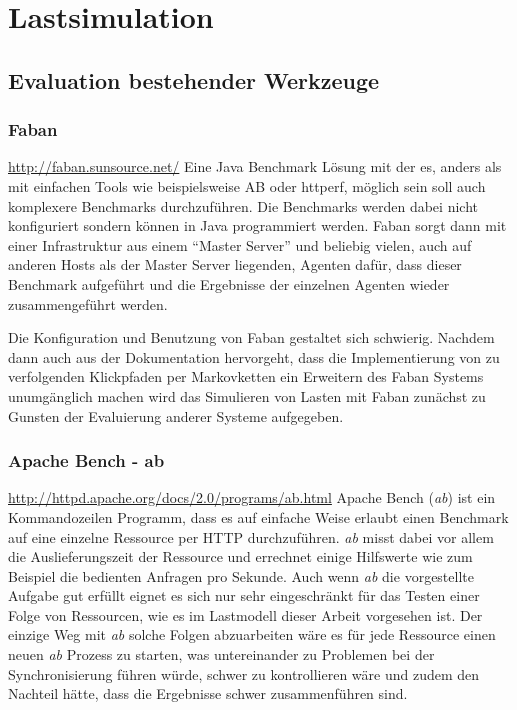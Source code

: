 \documentclass[1p]{scrartcl}
\begin{document}
  \section{Lastsimulation}
  \subsection{Evaluation bestehender Werkzeuge}
  \subsubsection{Faban}
  \url{http://faban.sunsource.net/}
  Eine Java Benchmark Lösung mit der es, anders als mit einfachen Tools wie
  beispielsweise AB oder httperf, möglich sein soll auch komplexere Benchmarks
  durchzuführen. Die Benchmarks werden dabei nicht konfiguriert sondern können
  in Java programmiert werden. Faban sorgt dann mit einer Infrastruktur aus 
  einem ``Master Server'' und beliebig vielen, auch auf anderen Hosts als der
  Master Server liegenden, Agenten dafür, dass dieser Benchmark aufgeführt und
  die Ergebnisse der einzelnen Agenten wieder zusammengeführt werden.
  
  Die Konfiguration und Benutzung von Faban gestaltet sich schwierig. Nachdem 
  dann auch aus der Dokumentation hervorgeht, dass die Implementierung von
  zu verfolgenden Klickpfaden per Markovketten ein Erweitern des Faban Systems
  unumgänglich machen wird das Simulieren von Lasten mit Faban zunächst zu 
  Gunsten der Evaluierung anderer Systeme aufgegeben.
  
  \subsubsection{Apache Bench - ab}
  \url{http://httpd.apache.org/docs/2.0/programs/ab.html}
  Apache Bench (\textit{ab}) ist ein Kommandozeilen Programm, dass es auf einfache Weise
  erlaubt einen Benchmark auf eine einzelne Ressource per HTTP durchzuführen.
  \textit{ab} misst dabei vor allem die Auslieferungszeit der Ressource und errechnet
  einige Hilfswerte wie zum Beispiel die bedienten Anfragen pro Sekunde.
  Auch wenn \textit{ab} die vorgestellte Aufgabe gut erfüllt eignet es sich nur sehr
  eingeschränkt für das Testen einer Folge von Ressourcen, wie es im Lastmodell
  dieser Arbeit vorgesehen ist. Der einzige Weg mit \textit{ab} solche Folgen 
  abzuarbeiten wäre es für jede Ressource einen neuen \textit{ab} Prozess zu starten, was
  untereinander zu Problemen bei der Synchronisierung führen würde, 
  schwer zu kontrollieren wäre und zudem den Nachteil hätte, dass die Ergebnisse
  schwer zusammenführen sind.
  
\end{document}

